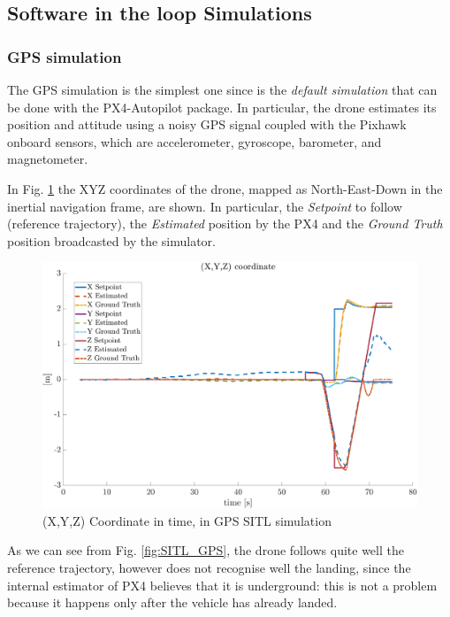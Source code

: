 \documentclass[journal]{IEEEtran}
\begin{document}
\subsection{Software in the loop Simulations}

\subsubsection{GPS simulation}

The GPS simulation is the simplest one since is the \textit{default simulation} that can be done with the PX4-Autopilot package. In particular, the drone estimates its position and attitude using a noisy GPS signal coupled with the Pixhawk onboard sensors, which are accelerometer, gyroscope, barometer, and magnetometer. 

In Fig. \ref{fig:SITL_GPS_TIME} the XYZ coordinates of the drone, mapped as North-East-Down in the inertial navigation frame, are shown. In particular, the \textit{Setpoint} to follow (reference trajectory), the \textit{Estimated} position by the PX4 and the \textit{Ground Truth} position broadcasted by the simulator.

\begin{figure}
    \centering
    \includegraphics[scale=0.2]{Images/SITL_GPS/XYZ_Sitl_gps_time.png}
    \caption{(X,Y,Z) Coordinate in time, in GPS SITL simulation}
    \label{fig:SITL_GPS_TIME}
\end{figure}

As we can see from Fig. \ref{fig:SITL_GPS}, the drone follows quite well the reference trajectory, however does not recognise well the landing, since the internal estimator of PX4 believes that it is underground: this is not a problem because it happens only after the vehicle has already landed.
\end{document}

